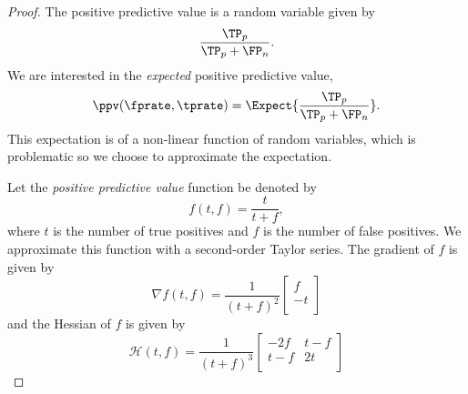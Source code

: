 \begin{proof}
The positive predictive value is a random variable given by
\begin{equation}
    \frac{\TP_p}{\TP_p + \FP_n}.
\end{equation}
We are interested in the \emph{expected} positive predictive value,
\begin{equation}
    \ppv(\fprate,\tprate) = \Expect{\frac{\TP_p}{\TP_p + \FP_n}}.
\end{equation}
This expectation is of a non-linear function of random variables, which is problematic so we choose to approximate the expectation.

Let the \emph{positive predictive value} function be denoted by
\begin{equation}
    f(t, f) = \frac{t}{t + f},
\end{equation}
where $t$ is the number of true positives and $f$ is the number of false positives.
We approximate this function with a second-order Taylor series.
The gradient of $f$ is given by
\begin{equation}
    \nabla f(t,f) =
    \frac{1}{(t + f)^2}
    \begin{bmatrix}
        f\\
        -t\\
    \end{bmatrix}
\end{equation}
and the Hessian of $f$ is given by
\begin{equation}
    \mathcal{H}(t,f) =
    \frac{1}{(t + f)^3}
    \begin{bmatrix}
        -2 f & t-f\\
        t-f & 2 t \\
    \end{bmatrix}
\end{equation}


\end{proof}
